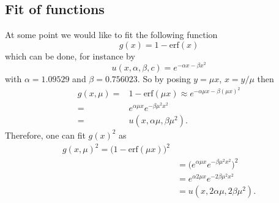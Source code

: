 \documentclass[aip,jcp,reprint,noshowkeys,superscriptaddress]{revtex4-1}
\begin{document}
\subsection{Fit of functions}
At some point we would like to fit the following function
\begin{equation}
 g(x) = 1-\text{erf}(x)
\end{equation}
which can be done, for instance by 
\begin{equation}
 u(x,\alpha,\beta,c) = e^{-\alpha x - \beta x^2}
\end{equation}
with $\alpha=1.09529$ and $\beta = 0.756023$. 
So by posing $y=\mu x$, $x=y/\mu$ then
\begin{equation}
 \label{fit_erf}
 \begin{aligned}
  g(x,\mu)  =& 1 - \text{erf}(\mu x) \approx e^{-\alpha \mu x - \beta (\mu x)^2}\\ 
        =& e^{\alpha \mu x } e^{-\beta \mu^2 x^2} \\
        =& u(x,\alpha \mu, \beta \mu^2).
 \end{aligned}
\end{equation}
Therefore, one can fit $g(x)^2$ as 
\begin{equation}
 \begin{aligned}
 g(x,\mu)^2 = \bigg( 1 - \text{erf}(\mu x) \bigg)^2\\
           &= \bigg( e^{\alpha \mu x } e^{-\beta \mu^2 x^2}\bigg)^2 \\
           &= e^{\alpha 2 \mu x } e^{-2 \beta \mu^2 x^2} \\
           &= u(x,2 \alpha \mu, 2 \beta \mu^2).
 \end{aligned}
\end{equation}
\end{document}
